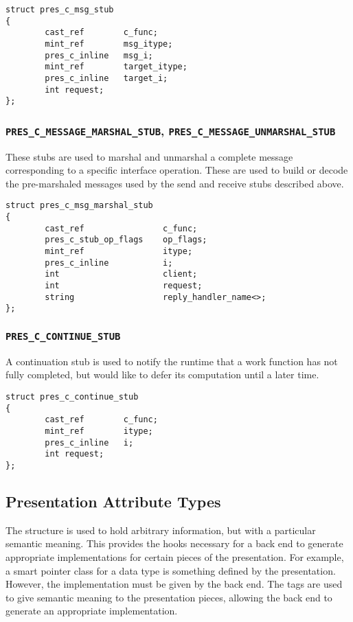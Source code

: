 \begin{verbatim}
struct pres_c_msg_stub
{
        cast_ref        c_func;
        mint_ref        msg_itype;
        pres_c_inline   msg_i;
        mint_ref        target_itype;
        pres_c_inline   target_i;
        int request;
};
\end{verbatim}

\subsubsection{\texttt{PRES\_C\_MESSAGE\_MARSHAL\_STUB},
               \texttt{PRES\_C\_MESSAGE\_UNMARSHAL\_STUB}}

These stubs are used to marshal and unmarshal a complete message corresponding
to a specific interface operation.  These are used to build or decode the
pre-marshaled messages used by the send and receive stubs described above.

\begin{verbatim}
struct pres_c_msg_marshal_stub
{
        cast_ref                c_func;
        pres_c_stub_op_flags    op_flags;
        mint_ref                itype;
        pres_c_inline           i;
        int                     client;
        int                     request;
        string                  reply_handler_name<>;
};
\end{verbatim}

\subsubsection{\texttt{PRES\_C\_CONTINUE\_STUB}}

A continuation stub is used to notify the runtime that a work function has not
fully completed, but would like to defer its computation until a later time.

\begin{verbatim}
struct pres_c_continue_stub
{
        cast_ref        c_func;
        mint_ref        itype;
        pres_c_inline   i;
        int request;
};
\end{verbatim}



\subsection{Presentation Attribute Types}
\label{subsec:PRESC:Presentation Attribute Types}

The  structure is used to hold arbitrary information, but with
a particular semantic meaning.  This provides the hooks necessary for a back
end to generate appropriate implementations for certain pieces of the
presentation.  For example, a smart pointer class for a data type is something
defined by the presentation.  However, the implementation must be given by the
back end.  The tags are used to give semantic meaning to the presentation
pieces, allowing the back end to generate an appropriate implementation.

